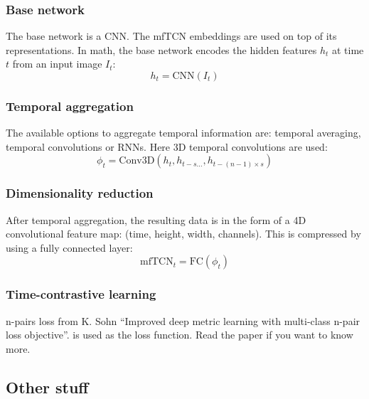 \documentclass{article}
\begin{document}
\subsubsection{Base network}
The base network is a CNN.
The mfTCN embeddings are used on top of its representations.
In math, the base network encodes the hidden features $ h_{ t }  $ at time $ t  $
from an input image $ I_{ t }  $:
\begin{equation}
		h_{ t } = \text{CNN}(I_{ t })
\end{equation}

\subsubsection{Temporal aggregation}
The available options to aggregate temporal information are:
temporal averaging, temporal convolutions or RNNs.
Here 3D temporal convolutions are used:
\begin{equation}
		\phi_{ t } = \text{Conv3D} (h_{ t }, h_{ t-s  \dots}, h_{ t - (n-1) \times s })
\end{equation}

\subsubsection{Dimensionality reduction}
After temporal aggregation, the resulting data is in the form
of a 4D convolutional feature map: (time, height, width, channels).
This is compressed by using a fully connected layer:
\begin{equation}
		\text{mfTCN}_{ t } = \text{FC}(\phi_{ t })
\end{equation}

\subsubsection{Time-contrastive learning}
n-pairs loss from K. Sohn ``Improved deep metric learning with multi-class n-pair loss objective''.
is used as the loss function.
Read the paper if you want to know more.


\subsection{Other stuff}
\end{document}
